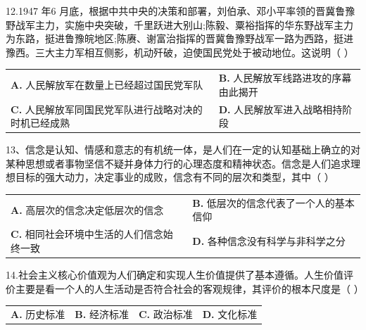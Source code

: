 \documentclass[UTF8,11pt]{ctexart}
\begin{document}
12.1947 年6 月底，根据中共中央的决策和部署，刘伯承、邓小平率领的晋冀鲁豫野战军主力，实施中央突破，千里跃进大别山;陈毅、粟裕指挥的华东野战军主力为东路，挺进鲁豫皖地区;陈赓、谢富治指挥的晋冀鲁豫野战军一路为西路，挺进豫西。三大主力军相互侧影，机动歼破，迫使国民党处于被动地位。这说明（  ）


\begin{center}\begin{tabular}{>{\raggedright\arraybackslash}p{\dimexpr(\linewidth-4\tabcolsep)/2\relax}>{\raggedright\arraybackslash}p{\dimexpr(\linewidth-4\tabcolsep)/2\relax}}
\textbf{A.} 人民解放军在数量上已经超过国民党军队 & \textbf{B.} 人民解放军线路进攻的序幕由此揭开\\[.35em]
\textbf{C.} 人民解放军同国民党军队进行战略对决的时机已经成熟 & \textbf{D.} 人民解放军进入战略相持阶段\\[.35em]\end{tabular}\end{center}

13、信念是认知、情感和意志的有机统一体，是人们在一定的认知基础上确立的对某种思想或者事物坚信不疑并身体力行的心理态度和精神状态。信念是人们追求理想目标的强大动力，决定事业的成败，信念有不同的层次和类型，其中（  ）


\begin{center}\begin{tabular}{>{\raggedright\arraybackslash}p{\dimexpr(\linewidth-4\tabcolsep)/2\relax}>{\raggedright\arraybackslash}p{\dimexpr(\linewidth-4\tabcolsep)/2\relax}}
\textbf{A.} 高层次的信念决定低层次的信念 & \textbf{B.} 低层次的信念代表了一个人的基本信仰\\[.35em]
\textbf{C.} 相同社会环境中生活的人们信念始终一致 & \textbf{D.} 各种信念没有科学与非科学之分\\[.35em]\end{tabular}\end{center}

14.社会主义核心价值观为人们确定和实现人生价值提供了基本遵循。人生价值评价主要是看一个人的人生活动是否符合社会的客观规律，其评价的根本尺度是（  ）


\begin{center}\begin{tabular}{>{\raggedright\arraybackslash}p{\dimexpr(\linewidth-8\tabcolsep)/4\relax}>{\raggedright\arraybackslash}p{\dimexpr(\linewidth-8\tabcolsep)/4\relax}>{\raggedright\arraybackslash}p{\dimexpr(\linewidth-8\tabcolsep)/4\relax}>{\raggedright\arraybackslash}p{\dimexpr(\linewidth-8\tabcolsep)/4\relax}}
\textbf{A.} 历史标准 & \textbf{B.} 经济标准 & \textbf{C.} 政治标准 & \textbf{D.} 文化标准\\[.35em]\end{tabular}\end{center}
\end{document}
